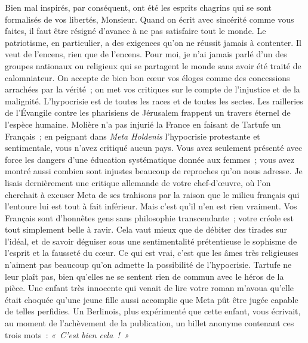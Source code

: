 \documentclass[french,twoside]{book} %
\newcommand\orgName[1]{#1}
\newcommand\persName[1]{#1}
\newcommand\placeName[1]{#1}
\begin{document}
Bien mal inspirés, par conséquent, ont été les esprits chagrins qui se sont formalisés de vos libertés, Monsieur. Quand on écrit avec sincérité comme vous faites, il faut être résigné d’avance à ne pas satisfaire tout le monde. Le patriotisme, en particulier, a des exigences qu’on ne réussit jamais à contenter. Il veut de l’encens, rien que de l’encens. Pour moi, je n’ai jamais parlé d’un des groupes nationaux ou religieux qui se partagent le monde sans avoir été traité de calomniateur. On accepte de bien bon cœur vos éloges comme des concessions arrachées par la vérité ; on met vos critiques sur le compte de l’injustice et de la malignité. L’hypocrisie est de toutes les races et de toutes les sectes. Les railleries de l’Évangile contre les {\orgName pharisiens} de {\placeName Jérusalem} frappent un travers éternel de l’espèce humaine. {\persName Molière} n’a pas injurié la {\orgName France} en faisant de {\persName Tartufe} un Français ; en peignant dans \emph{Meta Holdenis} l’hypocrisie protestante et sentimentale, vous n’avez critiqué aucun pays. Vous avez seulement présenté avec force les dangers d’une éducation systématique donnée aux femmes ; vous avez montré aussi combien sont injustes beaucoup de reproches qu’on nous adresse. Je lisais dernièrement une critique allemande de votre chef-d’œuvre, où l’on cherchait à excuser {\persName Meta} de ses trahisons par la raison que le milieu français qui l’entoure lui est tout à fait inférieur. Mais c’est qu’il n’en est rien vraiment. Vos Français sont d’honnêtes gens sans philosophie transcendante ; votre créole est tout simplement belle à ravir. Cela vaut mieux que de débiter des tirades sur l’idéal, et de savoir déguiser sous une sentimentalité prétentieuse le sophisme de l’esprit et la fausseté du cœur. Ce qui est vrai, c’est que les âmes très religieuses n’aiment pas beaucoup qu’on admette la possibilité de l’hypocrisie. {\persName Tartufe} ne leur plaît pas, bien qu’elles ne se sentent rien de commun avec le héros de la pièce. Une enfant très innocente qui venait de lire votre roman m’avoua qu’elle était choquée qu’une jeune fille aussi accomplie que {\persName Meta} pût être jugée capable de telles perfidies. Un Berlinois, plus expérimenté que cette enfant, vous écrivait, au moment de l’achèvement de la publication, un billet anonyme contenant ces trois mots : \emph{« C’est bien cela ! »}\par
\end{document}

